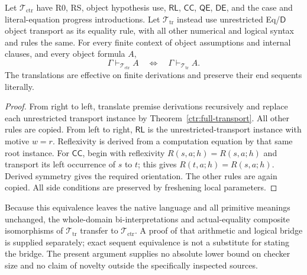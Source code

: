 \begin{corollary}
\label{ctr:exact-equivalence}
Let $\mathcal T_{\mathrm{ctr}}$ have R0, RS, object hypothesis use,
$\mathsf{RL}$, $\mathsf{CC}$, $\mathsf{QE}$,
$\mathsf{DE}$, and the case and literal-equation progress introductions.
Let $\mathcal T_{\mathrm{tr}}$ instead use unrestricted Eq/$\mathsf D$
object transport as its equality rule, with all other numerical and
logical syntax and rules the same. For every finite context of object
assumptions and internal clauses, and every object formula $A$,
\[
 \Gamma\vdash_{\mathcal T_{\mathrm{ctr}}}A
 \quad\Longleftrightarrow\quad
 \Gamma\vdash_{\mathcal T_{\mathrm{tr}}}A.
\]
The translations are effective on finite derivations and preserve their
end sequents literally.
\end{corollary}
\begin{proof}
From right to left, translate premise derivations recursively and replace
each unrestricted transport instance by
Theorem~\ref{ctr:full-transport}. All other rules are copied.
From left to right, $\mathsf{RL}$ is the unrestricted-transport instance
with motive $w=r$. Reflexivity is derived from a computation equation
by that same root instance. For $\mathsf{CC}$, begin with reflexivity
$R(s,a;h)=R(s,a;h)$ and transport its left occurrence of $s$ to $t$;
this gives $R(t,a;h)=R(s,a;h)$. Derived symmetry gives the required
orientation. The other rules are again copied. All side conditions are
preserved by freshening local parameters.
\end{proof}

Because this equivalence leaves the native language and all primitive
meanings unchanged, the whole-domain bi-interpretations and actual-equality
composite isomorphisms of $\mathcal T_{\mathrm{tr}}$ transfer to
$\mathcal T_{\mathrm{ctr}}$. A proof of that arithmetic and logical
bridge is supplied separately; exact sequent equivalence is not a
substitute for stating the bridge. The present argument supplies no
absolute lower bound on checker size and no claim of novelty outside
the specifically inspected sources.
